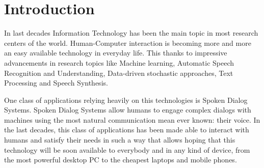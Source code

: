 \chapter{Introduction}

In last decades Information Technology has been the main topic in most
research centers of the world. Human-Computer interaction is becoming
more and more an easy available technology in everyday life. This thanks
to impressive advancements in research topics like Machine learning, Automatic
Speech Recognition and Understanding, Data-driven stochastic
approaches, Text Processing and Speech Synthesis.
\par
One class of applications relying heavily on this technologies is Spoken
Dialog Systems. Spoken Dialog Systems allow humans to engage complex
dialogs with machines using the most natural communication mean ever
known: their voice. In the last decades, this class of applications has
been made able to interact with humans and satisfy their needs in such
a way that allows hoping that this technology will be soon available to
everybody and in any kind of device, from the most powerful desktop PC
to the cheapest laptops and mobile phones.


